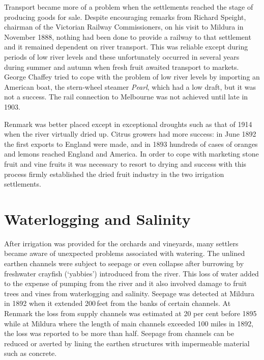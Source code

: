 Transport became more of a problem when the settlements reached the
stage of producing goods for sale.  Despite encouraging remarks from
Richard Speight,  chairman of the Victorian Railway
Commissioners, on his visit to Mildura in November 1888, nothing had
been done to provide a railway to that
settlement and it remained dependent on river transport.  This was
reliable except during periods of low river levels and these
unfortunately occurred in several years during summer and autumn when
fresh fruit awaited transport to markets.  George Chaffey
tried to cope with the problem of low river levels by importing an
American boat,  the
stern-wheel steamer \textit{Pearl}, which had a low draft, but it was
not a success.  The rail connection to
Melbourne was not achieved until late in 1903.

Renmark was better placed except in exceptional
droughts such as that of 1914 when the river virtually
dried up.  Citrus growers had more success: in June 1892 the first
exports to England were made, and in 1893 hundreds of cases of
oranges and lemons reached England and
America.  In order to cope with marketing stone
fruit and vine fruits it was necessary to resort to
drying and success with this process firmly established the dried
fruit industry in the two irrigation
settlements.

\section*{Waterlogging and Salinity}

After irrigation was provided for the orchards and vineyards, many
settlers became aware of unexpected problems associated with watering.
The unlined earthen channels were
subject to seepage  or even collapse after burrowing by
freshwater crayfish (`yabbies') introduced from the river.  This loss
of water added to the expense of pumping from the river and it also
involved damage to fruit trees and vines from waterlogging and
salinity.  Seepage was detected at Mildura in 1892 when it extended
200\,feet from the banks of certain channels.  At Renmark the loss
from supply channels was estimated at 20 per cent before 1895 while at
Mildura where the length of main channels exceeded 100 miles in 1892,
the loss was reported to be more than half. Seepage
from channels can be reduced or averted by lining the earthen
structures with impermeable material such as
concrete.

